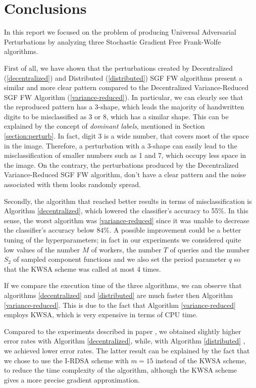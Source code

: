 \section{Conclusions}
In this report we focused on the problem of producing Universal Adversarial Perturbations by analyzing three
Stochastic Gradient Free Frank-Wolfe algorithms.

First of all, we have shown that the perturbations created by Decentralized (\ref{decentralized}) and Distributed (\ref{distributed})
SGF FW algorithms present a similar and more clear pattern compared to the Decentralized Variance-Reduced SGF FW
Algorithm (\ref{variance-reduced}). In particular, we can clearly see that the reproduced pattern has a 3-shape, which
leads the majority of handwritten digits to be misclassified as 3 or 8, which has a similar shape. This can be explained by the concept of \textit{dominant labels},
mentioned in Section \ref{section:perturb}. In fact, digit 3 is a wide number, that covers most of the space in the image. Therefore, a
perturbation with a 3-shape can easily lead to the misclassification of smaller numbers such as 1 and 7, which occupy
less space in the image. On the contrary, the perturbations produced by the Decentralized Variance-Reduced SGF FW algorithm,
don't have a clear pattern and the noise associated with them looks randomly spread.

Secondly, the algorithm that reached better results in terms of misclassification is Algorithm \ref{decentralized},
which lowered the classifier's accuracy to 55\%. In this sense, the worst algorithm was \ref{variance-reduced} since
it was unable to decrease the classifier's accuracy below 84\%. A possible improvement could be a better tuning of the hyperparameters; in fact in our experiments we considered quite low values of the number $M$ of workers, the number $T$ of queries and the number $S_2$ of sampled component functions and we also set the period parameter $q$ so that the KWSA scheme was called at most 4 times. 

If we compare the execution time of the three algorithms, we can observe that algorithms \ref{decentralized} and \ref{distributed}
are much faster then Algorithm \ref{variance-reduced}. This is due to the fact that Algorithm \ref{variance-reduced}
employs KWSA, which is very expensive in terms of CPU time.

Compared to the experiments described in paper \cite{A3}, we obtained slightly higher error rates with Algorithm
\ref{decentralized}, while, with Algorithm \ref{distributed} , we achieved lower error rates. The latter result can be
explained by the fact that we chose to use the I-RDSA scheme with $m=15$ instead of the KWSA scheme, to reduce the time
complexity of the algorithm, although the KWSA scheme gives a more precise gradient approximation. 

